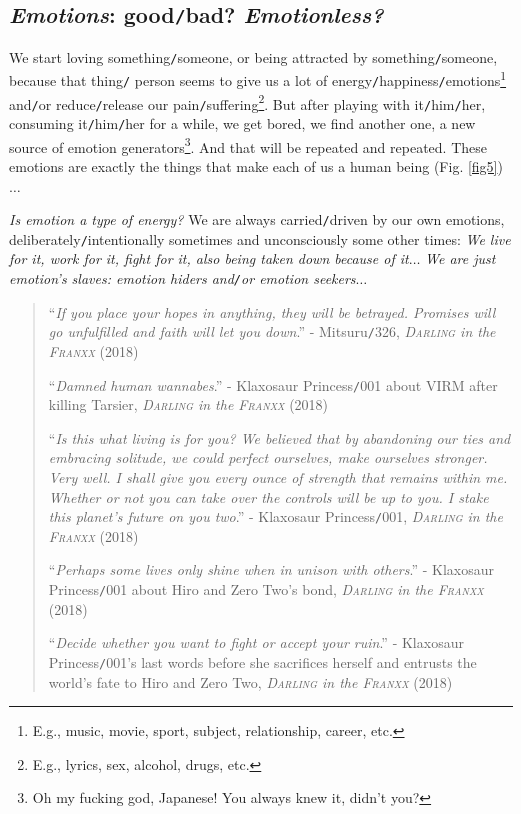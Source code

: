 \documentclass[12pt]{article}
\numberwithin{equation}{section}
\begin{document}
\subsection{\textit{Emotions}: good\texttt{/}bad? \textit{Emotionless?}}
\noindent
{} We start loving something\texttt{/}someone, or being attracted by something\texttt{/}someone, because that thing\texttt{/} person seems to give us a lot of energy\texttt{/}happiness\texttt{/}emotions\footnote{E.g., music, movie, sport, subject, relationship, career, etc.} and\texttt{/}or reduce\texttt{/}release our pain\texttt{/}suffering\footnote{E.g., lyrics, sex, alcohol, drugs, etc.}. But after playing with it\texttt{/}him\texttt{/}her, consuming it\texttt{/}him\texttt{/}her for a while, we get bored, we find another one, a new source of emotion generators\footnote{Oh my fucking god, Japanese! You always knew it, didn't you?}. And that will be repeated and repeated. These emotions are exactly the things that make each of us a human being (Fig. \ref{fig5})$\ldots$

\textit{Is emotion a type of energy?} We are always carried\texttt{/}driven by our own emotions, deliberately\texttt{/}intentionally sometimes and unconsciously some other times: \textit{We live for it, work for it, fight for it, also being taken down because of it}$\ldots$ \textit{We are just emotion's slaves: emotion hiders and\texttt{/}or emotion seekers}$\ldots$
\begin{quotation}
    ``\textit{If you place your hopes in anything, they will be betrayed. Promises will go unfulfilled and faith will let you down}.'' - Mitsuru\texttt{/}326, \textit{\textsc{Darling} in the \textsc{Franxx}} (2018)
    
    ``\textit{Damned human wannabes}.'' - Klaxosaur Princess\texttt{/}001 about VIRM after killing Tarsier, \textit{\textsc{Darling} in the \textsc{Franxx}} (2018)
    
    ``\textit{Is this what living is for you? We believed that by abandoning our ties and embracing solitude, we could perfect ourselves, make ourselves stronger. Very well. I shall give you every ounce of strength that remains within me. Whether or not you can take over the controls will be up to you. I stake this planet's future on you two}.'' - Klaxosaur Princess\texttt{/}001, \textit{\textsc{Darling} in the \textsc{Franxx}} (2018)
    
    ``\textit{Perhaps some lives only shine when in unison with others}.'' - Klaxosaur Princess\texttt{/}001 about Hiro and Zero Two's bond, \textit{\textsc{Darling} in the \textsc{Franxx}} (2018)
    
    ``\textit{Decide whether you want to fight or accept your ruin}.'' - Klaxosaur Princess\texttt{/}001's last words before she sacrifices herself and entrusts the world's fate to Hiro and Zero Two, \textit{\textsc{Darling} in the \textsc{Franxx}} (2018)
\end{quotation}
\end{document}
